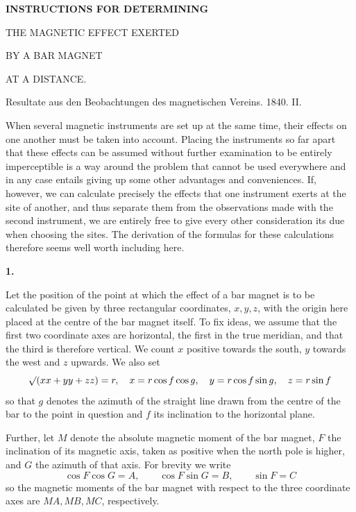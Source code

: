 \clearpage
{}
\begin{center}
{\Large\bfseries INSTRUCTIONS FOR DETERMINING\par\medskip THE MAGNETIC EFFECT EXERTED\par\medskip BY A BAR MAGNET\par\medskip AT A DISTANCE.}
\par\bigskip
Resultate aus den Beobachtungen des magnetischen Vereins. 1840. II.
\end{center}
\renewcommand{\Article}[1]{\par\medskip\Needspace{4\baselineskip}\pdfbookmark[1]{#1.}{fernwirkung-art-#1}\centerline{\textbf{#1.}}\nobreak\smallskip}%
When several magnetic instruments are set up at the same time, their effects on one another must be taken into account. Placing the instruments so far apart that these effects can be assumed without further examination to be entirely imperceptible is a way around the problem that cannot be used everywhere and in any case entails giving up some other advantages and conveniences. If, however, we can calculate precisely the effects that one instrument exerts at the site of another, and thus separate them from the observations made with the second instrument, we are entirely free to give every other consideration its due when choosing the sites. The derivation of the formulas for these calculations therefore seems well worth including here.

\Article{1}
Let the position of the point at which the effect of a bar magnet is to be calculated be given by three rectangular coordinates, $x,y,z$, with the origin here placed at the centre of the bar magnet itself. To fix ideas, we assume that the first two coordinate axes are horizontal, the first in the true meridian, and that the third is
therefore vertical. We count $x$ positive towards the south, $y$ towards the west and $z$ upwards. We also set
\[
\mathord{{}^{}\!\surd}(xx+yy+zz)=r,\quad x=r\cos f\cos g,\quad y=r\cos f\sin g,\quad z=r\sin f
\]
so that $g$ denotes the azimuth of the straight line drawn from the centre of the bar to the point in question and $f$ its inclination to the horizontal plane.

Further, let $M$ denote the absolute magnetic moment of the bar magnet, $F$ the inclination of its magnetic axis, taken as positive when the north pole is higher, and $G$ the azimuth of that axis. For brevity we write
\[
\cos F\cos G=A,\qquad\cos F\sin G=B,\qquad\sin F=C
\]
so the magnetic moments of the bar magnet with respect to the three coordinate axes are $MA,MB,MC$, respectively.

